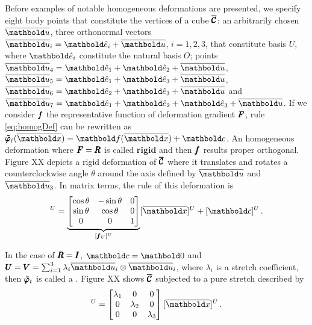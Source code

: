 \begin{example}
Before examples of notable homogeneous deformations are presented, we specify eight body points that constitute the vertices of a cube $\pmb{\overline{\mathcal{C}}}$: an arbitrarily chosen $\overline{\vto{u}}$, three orthonormal vectors $\overline{\vto{u}}_i=\vun{e}_i+\overline{\vto{u}}$, $i=1,2,3$, that constitute basis $U$, where $\vun{e}_i$ constitute the natural basis $O$; points $\overline{\vto{u}}_4=\vun{e}_1 + \vun{e}_2 + \overline{\vto{u}}$, $\overline{\vto{u}}_5=\vun{e}_1 + \vun{e}_3 + \overline{\vto{u}}$, $\overline{\vto{u}}_6=\vun{e}_2 + \vun{e}_3 + \overline{\vto{u}}$ and $\overline{\vto{u}}_7=\vun{e}_1+\vun{e}_2 + \vun{e}_3 + \overline{\vto{u}}$. If we consider $\pmb{f}$ the representative function of deformation gradient $\pmb{F}$, rule \eqref{eq:homogDef} can be rewritten as $\fua{\tnr{\tilde{\varphi}}_t}{\overline{\vto{x}}} =\fua{\vto{f}}{\overline{\vto{x}}} + \vto{c}$. An homogeneous deformation where $\pmb{F}=\pmb{R}$ is called \textbf{rigid} and then $\pmb{f}$ results proper orthogonal. Figure XX depicts a rigid deformation of $\pmb{\overline{\mathcal{C}}}$ where it translates and rotates a counterclockwise angle $\theta$ around the axis defined by $\overline{\vto{u}}$ and $\overline{\vto{u}}_3$. In matrix terms, the rule of this deformation is  
\begin{equation*}
[\fua{\tnr{\tilde{\varphi}}_t}{\overline{\vto{x}}}]^U=
\underbrace{\begin{bmatrix}
\cos\theta & -\sin\theta & 0\\
\sin\theta & \cos\theta & 0\\
0 & 0 & 1
\end{bmatrix}}_{[\vtf{f}_U]^U}
[\overline{\vto{x}}]^U + [\vto{c}]^U\,.
\end{equation*}


\begin{center}
\scalebox{.72}{}
\vspace{9pt}
\label{fg:defRigida}
\end{center}


In the case of $\pmb{R}=\pmb{I}$, $\vto{c}=\vto{0}$ and $\tnr{U}=\tnr{V}=\sum_{i=1}^3\lambda_{i}\overline{\vto{u}}_i\otimes\overline{\vto{u}}_i$, where $\lambda_i$ is a stretch coefficient, then $\pmb{\tilde{\varphi}}_t$ is called a . Figure XX shows $\pmb{\overline{\mathcal{C}}}$ subjected to a pure stretch described by      
\begin{equation*}
[\fua{\tnr{\tilde{\varphi}}_t}{\overline{\vto{x}}}]^U=
\begin{bmatrix}
\lambda_1 & 0 & 0\\
0 & \lambda_2 & 0\\
0 & 0 & \lambda_3
\end{bmatrix}
[\overline{\vto{x}}]^U\,.
\end{equation*}


\end{example}
